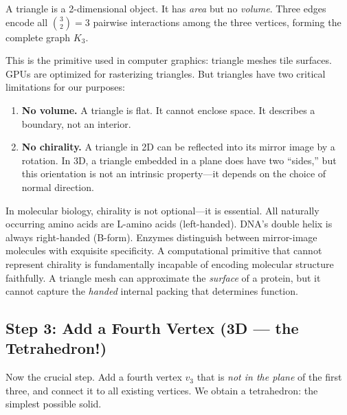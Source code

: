 A triangle is a 2-dimensional object. It has \emph{area} but no \emph{volume}.
Three edges encode all $\binom{3}{2} = 3$ pairwise interactions among the three
vertices, forming the complete graph $K_3$.

This is the primitive used in computer graphics: triangle meshes tile surfaces.
GPUs are optimized for rasterizing triangles. But triangles have two critical
limitations for our purposes:

\begin{enumerate}[leftmargin=2em]
  \item \textbf{No volume.} A triangle is flat. It cannot enclose space.
        It describes a boundary, not an interior.
  \item \textbf{No chirality.} A triangle in 2D can be reflected into its
        mirror image by a rotation. In 3D, a triangle embedded in a plane
        does have two ``sides,'' but this orientation is not an intrinsic
        property---it depends on the choice of normal direction.
\end{enumerate}

\begin{bioinsight}
In molecular biology, chirality is not optional---it is essential.
All naturally occurring amino acids are L-amino acids (left-handed).
DNA's double helix is always right-handed (B-form).
Enzymes distinguish between mirror-image molecules with exquisite specificity.
A computational primitive that cannot represent chirality is fundamentally
incapable of encoding molecular structure faithfully.
A triangle mesh can approximate the \emph{surface} of a protein, but it
cannot capture the \emph{handed} internal packing that determines function.
\end{bioinsight}

\subsection{Step 3: Add a Fourth Vertex (3D --- the Tetrahedron!)}
\label{sec:step3-tetrahedron}

Now the crucial step. Add a fourth vertex $v_3$ that is \emph{not in the plane}
of the first three, and connect it to all existing vertices. We obtain a
tetrahedron: the simplest possible solid.

